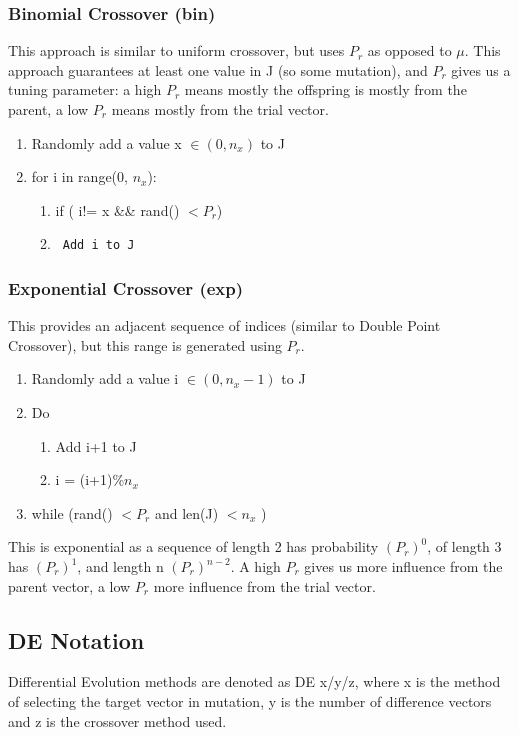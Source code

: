 \subsubsection{Binomial Crossover (bin)}
This approach is similar to uniform crossover, but uses $P_r$ as opposed to $\mu$. This approach guarantees at least one value in J (so some mutation), and $P_r$ gives us a tuning parameter: a high $P_r$  means mostly the offspring is mostly from the parent, a low $P_r$ means mostly from the trial vector. 
\begin{enumerate}
    \item Randomly add a value x $ \in (0, n_x)$ to J
    \item for i in range(0, $n_x$):
    \begin{enumerate}
        \item if ( i!= x \&\& rand() $< P_r$)
        \item [] \texttt{   Add i to J}
    \end{enumerate}
\end{enumerate}

\subsubsection{Exponential Crossover (exp)}
This provides an adjacent sequence of indices (similar to Double Point Crossover), but this range is generated using $P_r$. 
\begin{enumerate}
    \item Randomly add a value i $ \in (0, n_x-1)$ to J
    \item Do
    \begin{enumerate}
        \item Add i+1 to J
        \item i = (i+1)\%$n_x$
    \end{enumerate}
    \item [] while (rand() $< P_r$ and len(J) $< n_x$ )
\end{enumerate}
This is exponential as a sequence of length 2 has probability $(P_r)^0$, of length 3 has $(P_r)^1$, and length n $(P_r)^{n-2}$. A high $P_r$ gives us more influence from the parent vector, a low $P_r$ more influence from the trial vector.

\subsection{DE Notation}
Differential Evolution methods are denoted as DE x/y/z, where x is the method of selecting the target vector in mutation, y is the number of difference vectors and z is the crossover method used.

